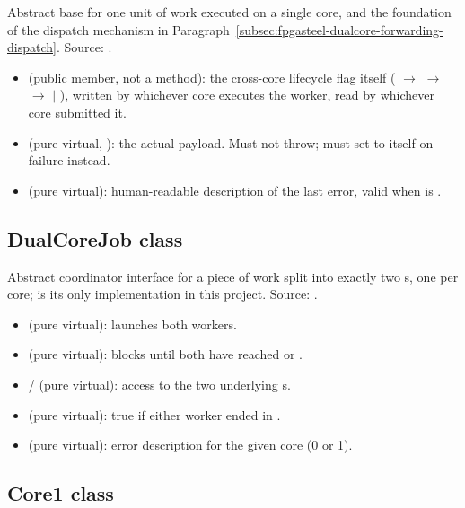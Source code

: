 Abstract base for one unit of work executed on a single core, and the foundation of the dispatch mechanism in Paragraph~\ref{subsec:fpgasteel-dualcore-forwarding-dispatch}. Source: .

\begin{itemize}
 \item {} (public  member, not a method): the cross-core lifecycle flag itself ( $\rightarrow$  $\rightarrow$  $\rightarrow$  $\mid$ ), written by whichever core executes the worker, read by whichever core submitted it.
 \item {} (pure virtual, ): the actual payload. Must not throw; must set  to  itself on failure instead.
 \item {} (pure virtual): human-readable description of the last error, valid when  is .
\end{itemize}

\subsection{DualCoreJob class}
\label{subsec:fpgasteel-dualcore-forwarding-dualcore-job}

Abstract coordinator interface for a piece of work split into exactly two s, one per core;  is its only implementation in this project. Source: .

\begin{itemize}
 \item {} (pure virtual): launches both workers.
 \item {} (pure virtual): blocks until both have reached  or .
 \item {}/ (pure virtual): access to the two underlying s.
 \item {} (pure virtual): true if either worker ended in .
 \item {} (pure virtual): error description for the given core (0 or 1).
\end{itemize}

\subsection{Core1 class}
\label{subsec:fpgasteel-dualcore-forwarding-core1}

